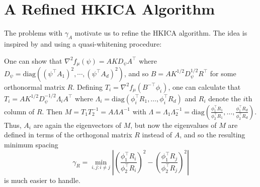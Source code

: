 \documentclass{article}
\theoremstyle{definition}
\begin{document}
\section{A Refined HKICA Algorithm}
\label{sec:DICA}

The problems with $\gamma_A$ motivate us to refine the HKICA algorithm.
The idea is inspired by \citet{arora2012provable} and \citet{frieze1996learning} using a quasi-whitening procedure:

One can show that $\nabla^2 f_\mu(\psi)=A K D_{\psi} A^\top$ where $D_{\psi}=\text{diag}\left((\psi^{\top}A_1)^2,\cdots, (\psi^{\top}A_d)^2\right)$,
and so $B=AK^{1/2}D_{\psi}^{1/2}R^{\top}$ for some orthonormal matrix $R$. Defining $T_i=\nabla^2 f_\mu(B^{-\top} \phi_i)$, one can calculate that
$T_i=A K^{1/2} D_\psi^{-1/2} \Lambda_i A^\top$ where $\Lambda_i=\text{diag}\left(\phi_i^\top R_1,\ldots,\phi_i^\top R_d\right)$ and $R_i$ denote the $i$th column of $R$.
Then $M=T_1 T_2^{-1} = A\Lambda A^{-1}$ with $\Lambda=\Lambda_1 \Lambda_2^{-1}=\text{diag}\left(\frac{\phi_1^\top R_1}{\phi_2^\top R_1},\ldots,\frac{\phi_1^\top R_d}{\phi_2^\top R_d}\right)$. Thus, $A_i$ are again the eigenvectors of $M$, but now the eigenvalues of $M$ are defined in terms of the orthogonal matrix $R$ instead of $A$,
and so the resulting minimum spacing
\begin{equation}
\label{def:gammaR}
\gamma_R =  \min_{i,j: i\neq j} \left\vert \left(\frac{\phi_1^{\top}R_i}{\phi_2^{\top}R_i}\right)^2 - \left(\frac{\phi_1^{\top}R_j}{\phi_2^{\top}R_j}\right)^2 \right\vert
\end{equation}
is much easier to handle.
\end{document}

